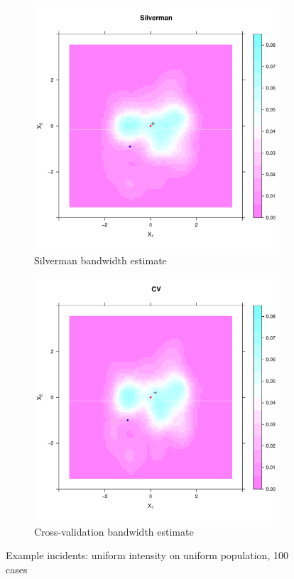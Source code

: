\begin{figure}[htbp]
    \begin{subfigure}[b]{0.45\textwidth}
    \includegraphics[width=\textwidth]{output/silverman_intensity_heatmap}
    \caption{Silverman bandwidth estimate}
    \end{subfigure}%
    \begin{subfigure}[b]{0.45\textwidth}
    \includegraphics[width=\textwidth]{output/CV_intensity_heatmap}
    \caption{Cross-validation bandwidth estimate}
    \end{subfigure}
    \caption[Example incidents: uniform intensity on uniform population, 100 cases]
        {Example incidents: uniform intensity on uniform population, 100 cases}
    \label{fig:cases_heatmap:template}
\end{figure}

